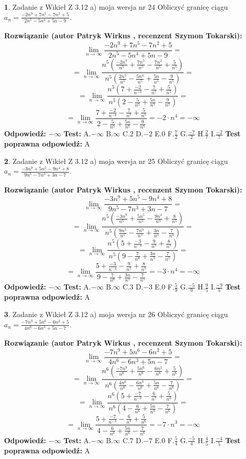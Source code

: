 \documentclass[12pt, a4paper]{article}
\theoremstyle{definition} %
\newtheorem{zad}{}
\newcommand{\zadStart}[1]{\begin{zad}#1\newline}
\newcommand{\zadStop}{\end{zad}}
\newcommand{\rozwStart}[2]{\noindent \textbf{Rozwiązanie (autor #1 , recenzent #2): }\newline}
\newcommand{\rozwStop}{\newline}
\newcommand{\odpStart}{\noindent \textbf{Odpowiedź:}\newline}
\newcommand{\odpStop}{\newline}
\newcommand{\testStart}{\noindent \textbf{Test:}\newline}
\newcommand{\testStop}{\newline}
\newcommand{\kluczStart}{\noindent \textbf{Test poprawna odpowiedź:}\newline}
\newcommand{\kluczStop}{\newline}
\begin{document}
\zadStart{Zadanie z Wikieł Z 3.12 a) moja wersja nr 24}
Obliczyć granicę ciągu $a_{n}=\frac{-2n^{9}+7n^{5}-7n^{2}+5}{2n^{5}-5n^{4}+5n-9}$.
\zadStop
\rozwStart{Patryk Wirkus}{Szymon Tokarski}
$$\lim\limits_{n\to\infty}\frac{-2n^{9}+7n^{5}-7n^{2}+5}{2n^{5}-5n^{4}+5n-9}=$$
$$=\lim\limits_{n\to\infty}\frac{n^{5}\left(\frac{-2n^{9}}{n^{5}}+\frac{7n^{5}}{n^{5}}-\frac{7n^{2}}{n^{5}}+\frac{5}{n^{5}}\right)}{n^{5}\left(\frac{2n^{5}}{n^{5}}-\frac{5n^{4}}{n^{5}}+\frac{5n}{n^{5}}-\frac{9}{n^{5}}\right)}=$$
$$=\lim\limits_{n\to\infty}\frac{n^{5}\left(7+\frac{-2}{n^{-4}}-\frac{7}{n^{7}}+\frac{5}{n^{5}}\right)}
{n^{5}\left(2-\frac{5}{n^{5}}+\frac{5n}{n^{5}}-\frac{9}{n^{5}}\right)}=$$
$$=\lim\limits_{n\to\infty}\frac{7+\frac{-2}{n^{-4}}-\frac{7}{n^{7}}+\frac{5}{n^{5}}}{2-\frac{5}{n^{5}}+\frac{5n}{n^{5}}-\frac{9}{n^{5}}}=-2\cdot n^{4} = -\infty$$
\rozwStop
\odpStart
$-\infty$
\odpStop
\testStart
A.$-\infty$
B.$\infty$
C.$2$
D.$-2$
E.$0$
F.$\frac{7}{2}$
G.$\frac{-7}{2}$
H.$\frac{2}{7}$
I.$\frac{-2}{7}$
\testStop
\kluczStart
A
\kluczStop



\zadStart{Zadanie z Wikieł Z 3.12 a) moja wersja nr 25}
Obliczyć granicę ciągu $a_{n}=\frac{-3n^{9}+5n^{5}-9n^{4}+8}{9n^{5}-7n^{3}+3n-7}$.
\zadStop
\rozwStart{Patryk Wirkus}{Szymon Tokarski}
$$\lim\limits_{n\to\infty}\frac{-3n^{9}+5n^{5}-9n^{4}+8}{9n^{5}-7n^{3}+3n-7}=$$
$$=\lim\limits_{n\to\infty}\frac{n^{5}\left(\frac{-3n^{9}}{n^{5}}+\frac{5n^{5}}{n^{5}}-\frac{9n^{4}}{n^{5}}+\frac{8}{n^{5}}\right)}{n^{5}\left(\frac{9n^{5}}{n^{5}}-\frac{7n^{3}}{n^{5}}+\frac{3n}{n^{5}}-\frac{7}{n^{5}}\right)}=$$
$$=\lim\limits_{n\to\infty}\frac{n^{5}\left(5+\frac{-3}{n^{-4}}-\frac{9}{n^{5}}+\frac{8}{n^{5}}\right)}
{n^{5}\left(9-\frac{7}{n^{6}}+\frac{3n}{n^{5}}-\frac{7}{n^{5}}\right)}=$$
$$=\lim\limits_{n\to\infty}\frac{5+\frac{-3}{n^{-4}}-\frac{9}{n^{5}}+\frac{8}{n^{5}}}{9-\frac{7}{n^{6}}+\frac{3n}{n^{5}}-\frac{7}{n^{5}}}=-3\cdot n^{4} = -\infty$$
\rozwStop
\odpStart
$-\infty$
\odpStop
\testStart
A.$-\infty$
B.$\infty$
C.$3$
D.$-3$
E.$0$
F.$\frac{5}{9}$
G.$\frac{-5}{9}$
H.$\frac{9}{5}$
I.$\frac{-9}{5}$
\testStop
\kluczStart
A
\kluczStop



\zadStart{Zadanie z Wikieł Z 3.12 a) moja wersja nr 26}
Obliczyć granicę ciągu $a_{n}=\frac{-7n^{9}+5n^{6}-6n^{2}+5}{4n^{6}-6n^{3}+5n-7}$.
\zadStop
\rozwStart{Patryk Wirkus}{Szymon Tokarski}
$$\lim\limits_{n\to\infty}\frac{-7n^{9}+5n^{6}-6n^{2}+5}{4n^{6}-6n^{3}+5n-7}=$$
$$=\lim\limits_{n\to\infty}\frac{n^{6}\left(\frac{-7n^{9}}{n^{6}}+\frac{5n^{6}}{n^{6}}-\frac{6n^{2}}{n^{6}}+\frac{5}{n^{6}}\right)}{n^{6}\left(\frac{4n^{6}}{n^{6}}-\frac{6n^{3}}{n^{6}}+\frac{5n}{n^{6}}-\frac{7}{n^{6}}\right)}=$$
$$=\lim\limits_{n\to\infty}\frac{n^{6}\left(5+\frac{-7}{n^{-3}}-\frac{6}{n^{7}}+\frac{5}{n^{6}}\right)}
{n^{6}\left(4-\frac{6}{n^{6}}+\frac{5n}{n^{6}}-\frac{7}{n^{6}}\right)}=$$
$$=\lim\limits_{n\to\infty}\frac{5+\frac{-7}{n^{-3}}-\frac{6}{n^{7}}+\frac{5}{n^{6}}}{4-\frac{6}{n^{6}}+\frac{5n}{n^{6}}-\frac{7}{n^{6}}}=-7\cdot n^{3} = -\infty$$
\rozwStop
\odpStart
$-\infty$
\odpStop
\testStart
A.$-\infty$
B.$\infty$
C.$7$
D.$-7$
E.$0$
F.$\frac{5}{4}$
G.$\frac{-5}{4}$
H.$\frac{4}{5}$
I.$\frac{-4}{5}$
\testStop
\kluczStart
A
\kluczStop
\end{document}
